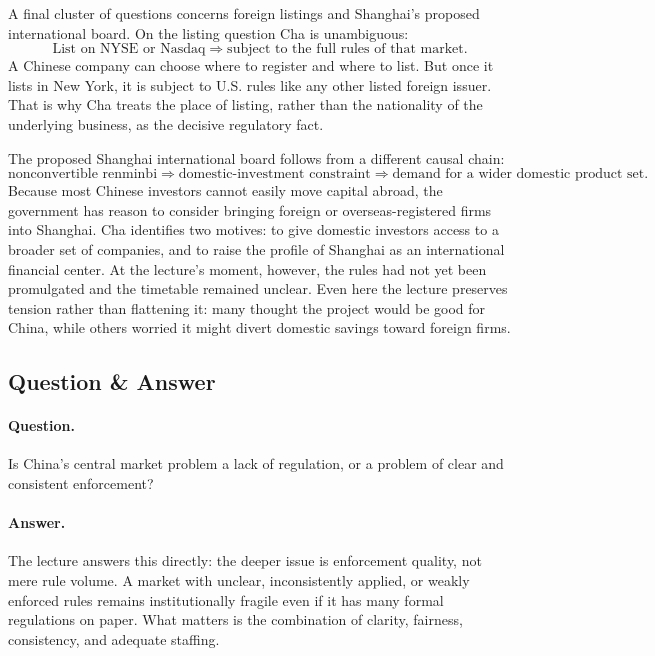 A final cluster of questions concerns foreign listings and Shanghai's proposed international board. On the listing question Cha is unambiguous:
\begin{equation}
\text{List on NYSE or Nasdaq}
\Rightarrow
\text{subject to the full rules of that market}.
\end{equation}
A Chinese company can choose where to register and where to list. But once it lists in New York, it is subject to U.S. rules like any other listed foreign issuer. That is why Cha treats the place of listing, rather than the nationality of the underlying business, as the decisive regulatory fact.

The proposed Shanghai international board follows from a different causal chain:
\begin{equation}
\text{nonconvertible renminbi}
\Rightarrow
\text{domestic-investment constraint}
\Rightarrow
\text{demand for a wider domestic product set}.
\end{equation}
Because most Chinese investors cannot easily move capital abroad, the government has reason to consider bringing foreign or overseas-registered firms into Shanghai. Cha identifies two motives: to give domestic investors access to a broader set of companies, and to raise the profile of Shanghai as an international financial center. At the lecture's moment, however, the rules had not yet been promulgated and the timetable remained unclear. Even here the lecture preserves tension rather than flattening it: many thought the project would be good for China, while others worried it might divert domestic savings toward foreign firms.

\subsection{Question \& Answer}

\paragraph{Question.} Is China's central market problem a lack of regulation, or a problem of clear and consistent enforcement?

\paragraph{Answer.} The lecture answers this directly: the deeper issue is enforcement quality, not mere rule volume. A market with unclear, inconsistently applied, or weakly enforced rules remains institutionally fragile even if it has many formal regulations on paper. What matters is the combination of clarity, fairness, consistency, and adequate staffing.

